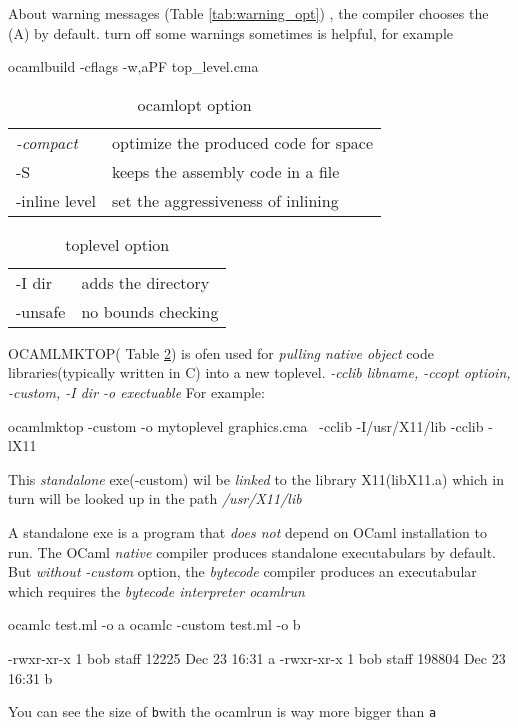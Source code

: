 About warning messages (Table \ref{tab:warning_opt}) , the compiler chooses the (A)
by default.  turn off some warnings sometimes is helpful, for example
\begin{bashcode}
ocamlbuild -cflags -w,aPF top_level.cma    
\end{bashcode}


\begin{table}
  \centering
  \begin{tabular}{|l|l|}
    \hline
  \textit{-compact} & optimize the produced code for space \\
  -S & keeps the assembly code in a file \\
  -inline level & set the aggressiveness of inlining \\
  \hline
  \end{tabular}
  \caption{ocamlopt option}
  \label{tab:ocamlopt_option}
\end{table}


\begin{table}
  \centering
  \begin{tabular}{|l|l|}
    \hline
  -I dir & adds the directory \\
  -unsafe & no bounds checking \\
  \hline
  \end{tabular}
  \caption{toplevel option}
  \label{tab:toplevel_opt}
\end{table}
OCAMLMKTOP( Table \ref{tab:toplevel_opt}) is ofen used for \textit{pulling native object}
code libraries(typically written in C) into a new toplevel.  \textit{
  -cclib libname, -ccopt optioin, -custom, -I dir -o exectuable }
For example:
\begin{bashcode}
ocamlmktop -custom -o mytoplevel graphics.cma \
   -cclib -I/usr/X11/lib -cclib -lX11
\end{bashcode}
  
This \textit{standalone} exe(-custom) wil be \textit{linked} to the
library X11(libX11.a) which in turn will be looked up in the path
\textit{/usr/X11/lib}

A standalone exe is a program that \textit{does not } depend on OCaml
installation to run.  The OCaml \textit{native} compiler produces standalone
executabulars by default. But \textit{without} \textit{-custom} option, the
\textit{bytecode} compiler produces an executabular which requires the
\textit{bytecode interpreter ocamlrun}

\begin{bashcode}
ocamlc test.ml -o a
ocamlc -custom test.ml -o b
\end{bashcode}
\begin{bluetext}
-rwxr-xr-x   1 bob  staff    12225 Dec 23 16:31 a
-rwxr-xr-x   1 bob  staff   198804 Dec 23 16:31 b
\end{bluetext}
You can see the size of \verb|b|with the ocamlrun is way more bigger
than \verb|a|

